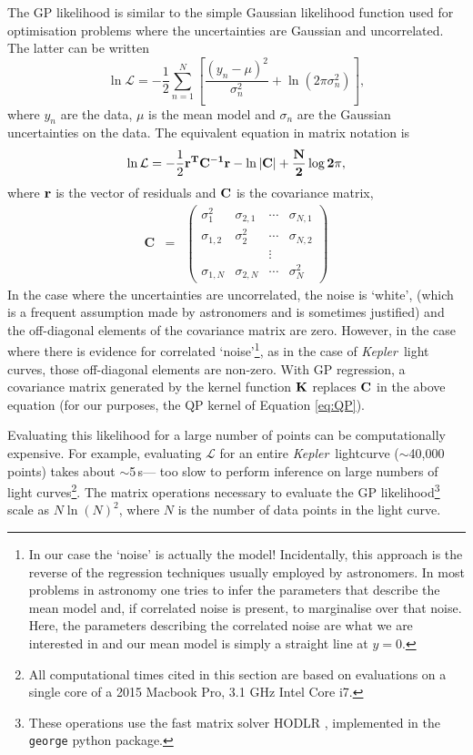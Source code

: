 \documentclass[useAMS, usenatbib, preprint, 12pt]{aastex}
\newcommand{\Kepler}{{\it Kepler}}
\begin{document}
The GP likelihood is similar to the simple Gaussian likelihood
function used for optimisation problems where the uncertainties are
Gaussian and uncorrelated. The latter can be written
\begin{equation}
    \ln \mathcal{L} = -\frac{1}{2}\sum_{n=1}^N\left[\frac{(y_n-\mu)^2}{\sigma_n^2}
    + \ln(2\pi\sigma_n^2)\right],
\end{equation}
\label{eq:chi2}
where $y_n$ are the data, $\mu$ is the mean model and $\sigma_n$ are the
Gaussian uncertainties on the data.
The equivalent equation in matrix notation is
\begin{equation}
\ln \mathcal{L} = -\frac{1}{2}\bf{r}^T\bf{C}^{-1}\bf{r}-\ln|\bf{C}|
    + \frac{N}{2}\log2\pi,
\end{equation}
\label{eq:lhf1}
where $\bf{r}$ is the vector of residuals and $\bf{C}$ is the covariance
matrix,
\begin{eqnarray}
    \mathbf{C} &=& \left (\begin{array}{cccc}
    \sigma^2_1 & \sigma_{2, 1} & \cdots & \sigma_{N, 1} \\
    \sigma_{1, 2} & \sigma^2_2 & \cdots & \sigma_{N, 2} \\
    && \vdots & \\
    \sigma_{1, N} & \sigma_{2, N} & \cdots & \sigma^2_N
\end{array}\right )
\end{eqnarray}
In the case where the uncertainties are uncorrelated, the noise is `white',
(which is a frequent assumption made by astronomers and is sometimes
justified) and the off-diagonal elements of the covariance matrix are zero.
However, in the case where there is evidence for correlated
`noise'\footnote{In our case the `noise' is actually the model!  Incidentally, this approach is the reverse of the regression techniques
usually employed by astronomers.
In most problems in astronomy one tries to infer the parameters that describe
the mean model and, if correlated noise is present, to marginalise over that
noise.
Here, the parameters describing the correlated noise are what we are
interested in and our mean model is simply a straight line at $y=0$.}, as in the
case of \Kepler\ light curves, those off-diagonal elements are non-zero.
With GP regression, a covariance matrix generated by the kernel function
${\bf K}$ replaces ${\bf C}$ in the above equation (for our purposes, the QP
kernel of Equation \ref{eq:QP}).

Evaluating this likelihood for a large number of points can be computationally
expensive.  For example, evaluating
$\mathcal L$ for an entire \Kepler\ lightcurve
($\sim$40,000 points) takes about $\sim$5\,s--- too slow
to perform inference on large numbers of light curves\footnote{All
computational times cited in this section are based on evaluations on a
single core of a 2015 Macbook Pro, 3.1 GHz Intel Core i7.}.
The matrix operations necessary to evaluate the GP likelihood\footnote{These
operations use the fast matrix solver HODLR \citep{Ambikasaran2014},
implemented in the {\tt george} \citep{George} python package.} scale as
$N\ln(N)^2$, where $N$ is the number of data points in the light curve.
\end{document}
